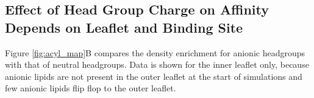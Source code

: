 \documentclass[%
 aip,
 amsmath,amssymb,
 preprint,%
]{revtex4-1}\usepackage{setspace}
\newcommand{\liam}[1]{\textcolor{black}{#1}}
\newcommand{\grace}[1]{\textcolor{black}{{#1}}}
\newcommand{\nachr}{nAChR}
\begin{document}
\subsection{Effect of Head Group Charge on Affinity Depends on Leaflet and Binding Site}
Figure \ref{fig:acyl_map}B compares the density enrichment for anionic headgroups with that of neutral headgroups. Data is shown for the inner leaflet only, because anionic lipids are not present in the outer leaflet at the start of simulations and few anionic lipids flip flop to the outer leaflet.%
\end{document}

